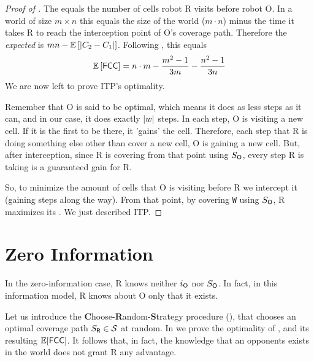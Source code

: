 \documentclass[a4paper,11pt]{article}
\theoremstyle{definition}
\newcommand{\rob}{{{\sf R}}\xspace}
\newcommand{\opp}{{{\sf O}}\xspace}
\newcommand{\w}{{{\texttt W}}\xspace}
\newcommand{\fcc}{{{\sf{FCC}}}\xspace}
\newcommand{\itp}{{{\textsf{ITP}}}\xspace}
\newcommand{\crs}{{{\sf{CRS}}}\xspace}
\DeclarePairedDelimiter\abs{\lvert}{\rvert}%
\begin{document}
\begin{proof} [Proof of ]
The \fcc equals the number of cells robot \rob visits before robot \opp. In a world of size $m \times n$ this equals the size of the world ($m\cdot n$) minus the time it takes \rob to reach the interception point of \opp's coverage path. Therefore the {\em expected} \fcc is $mn - \mathbb{E}\left[\abs*{C_2-C_1}\right]$. Following , this equals 
\[\mathbb{E}\left[\fcc\right]=%
n\cdot m - \frac{m^2-1}{3m} - \frac{n^2-1}{3n}\]
We are now left to prove \itp's optimality.

Remember that \opp is said to be optimal, which means it does as less steps as it can, and in our case, it does exactly $\abs*{w}$ steps.
In each step, \opp is visiting a new cell.
If it is the first to be there, it 'gains' the cell. 
Therefore, each step that \rob is doing something else other than cover a new cell, \opp is gaining a new cell. But, after interception, since \rob is covering from that point using $S_\opp$, every step \rob is taking is a guaranteed gain for \rob.

So, to minimize the amount of cells that \opp is visiting before \rob we intercept it (gaining steps along the way). From that point, by covering \w using $S_\opp$, \rob maximizes its \fcc. We just described \itp.
\end{proof}

\section{Zero Information}
In the zero-information case, \rob knows neither $i_\opp$ nor $S_\opp$. In fact, in this information model, \rob knows about \opp only that it exists.

Let us introduce the \textbf{C}hoose-\textbf{R}andom-\textbf{S}trategy procedure (\crs), that chooses an optimal coverage path $S_\rob\in\mathcal{S}$ at random. In  we prove the optimality of \crs, and its resulting $\mathbb{E}[\fcc]$. It follows that, in fact, the knowledge that an opponents exists in the world does not grant \rob any advantage.
\end{document}
